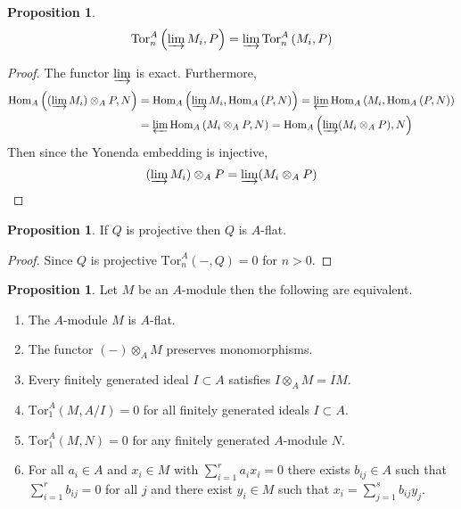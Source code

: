 \documentclass[12pt]{article}
\newcommand{\Tor}[4]{\mathrm{Tor}^{#1}_{#2} \left( #3, #4 \right)}
\newcommand{\Homover}[3]{\mathrm{Hom}_{#1} \left( #2, #3 \right)}
\theoremstyle{remark}
\theoremstyle{definition}
\newtheorem{proposition}[theorem]{Proposition}
\begin{document}
\begin{proposition}
\[ \Tor{A}{n}{\varinjlim M_i}{P} = \varinjlim \Tor{A}{n}{M_i}{P} \]
\end{proposition}

\begin{proof}
The functor $\varinjlim$ is exact. Furthermore, 
\begin{align*}
\Homover{A}{(\varinjlim M_i) \otimes_A P}{N} & = \Homover{A}{\varinjlim M_i}{\Homover{A}{P}{N}} = \varprojlim \Homover{A}{M_i}{\Homover{A}{P}{N}} 
\\
& = \varprojlim \Homover{A}{M_i \otimes_A P}{N} = \Homover{A}{\varinjlim (M_i \otimes_A P)}{N}
\end{align*} 
Then since the Yonenda embedding is injective,
\[ (\varinjlim M_i) \otimes_A P = \varinjlim (M_i \otimes_A P) \]
\end{proof}

\begin{proposition}
If $Q$ is projective then $Q$ is $A$-flat. 
\end{proposition}

\begin{proof}
Since $Q$ is projective $\Tor{A}{n}{-}{Q} = 0$ for $n > 0$. 
\end{proof}

\begin{proposition}
Let $M$ be an $A$-module then the following are equivalent.
\begin{enumerate}
\item The $A$-module $M$ is $A$-flat.

\item The functor $(-) \otimes_A M$ preserves monomorphisms.

\item Every finitely generated ideal $I \subset A$ satisfies $I \otimes_A M = I M$. 

\item $\Tor{A}{1}{M}{A/I} = 0$ for all finitely generated ideals $I \subset A$. 

\item $\Tor{A}{1}{M}{N} = 0$ for any finitely generated $A$-module $N$.

\item For all $a_i \in A$ and $x_i \in M$ with $\sum_{i = 1}^r a_i x_i = 0$ there exists $b_{ij} \in A$ such that $\sum_{i = 1}^r b_{ij} = 0$ for all $j$ and there exist $y_i \in M$ such that $x_i = \sum_{j = 1}^s b_{ij} y_j$. 
\end{enumerate}
\end{proposition}
\end{document}
